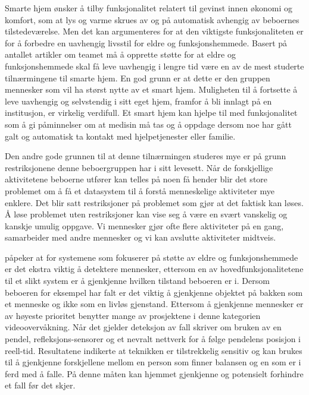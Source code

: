 {\color{blue}
Smarte hjem ønsker å tilby funksjonalitet relatert til gevinst innen økonomi og komfort, som at lys og varme skrues av og på automatisk avhengig av beboernes tilstedeværelse. Men det kan argumenteres for at den viktigste funksjonaliteten er for å forbedre en uavhengig livsstil for eldre og funksjonshemmede. Basert på antallet artikler om teamet må å opprette støtte for at eldre og funksjonshemmede skal få leve uavhengig i lengre tid være en av de mest studerte tilnærmingene til smarte hjem. En god grunn er at dette er den gruppen mennesker som vil ha størst nytte av et smart hjem. Muligheten til å fortsette å leve uavhengig og selvstendig i sitt eget hjem, framfor å bli innlagt på en institusjon, er virkelig verdifull. Et smart hjem kan hjelpe til med funksjonalitet som å gi påminnelser om at medisin må tas og å oppdage dersom noe har gått galt og automatisk ta kontakt med hjelpetjenester eller familie.

Den andre gode grunnen til at denne tilnærmingen studeres mye er på grunn restriksjonene denne beboergruppen har i sitt levesett. Når de forskjellige aktivitetene beboerne utfører kan telles på noen få hender blir det store problemet om å få et datasystem til å forstå menneskelige aktiviteter mye enklere. Det blir satt restriksjoner på problemet som gjør at det faktisk kan løses. Å løse problemet uten restriksjoner kan vise seg å være en svært vanskelig og kanskje umulig oppgave. Vi mennesker gjør ofte flere aktiviteter på en gang, samarbeider med andre mennesker og vi kan avslutte aktiviteter midtveis.

\citet{desilva12} påpeker at for systemene som fokuserer på støtte av eldre og funksjonshemmede er det ekstra viktig å detektere mennesker, ettersom en av hovedfunksjonalitetene til et slikt system er å gjenkjenne hvilken tilstand beboeren er i. Dersom beboeren for eksempel har falt er det viktig å gjenkjenne objektet på bakken som et menneske og ikke som en livløs gjenstand. Ettersom å gjenkjenne mennesker er av høyeste prioritet benytter mange av prosjektene i denne kategorien videoovervåkning. Når det gjelder deteksjon av fall skriver \citet{elliot09} om bruken av en pendel, refleksjons-sensorer og et nevralt nettverk for å følge pendelens posisjon i reell-tid. Resultatene indikerte at teknikken er tilstrekkelig sensitiv og kan brukes til å gjenkjenne forskjellene mellom en person som finner balansen og en som er i ferd med å falle. På denne måten kan hjemmet gjenkjenne og potensielt forhindre et fall før det skjer.

}
